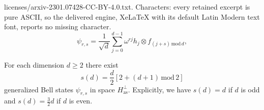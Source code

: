 \documentclass[10pt,a4paper]{amsart}
\newcommand{\aspace}{H_{\mathrm{as}}}
\begin{document}
licenses/arxiv-2301.07428-CC-BY-4.0.txt. Characters: every retained excerpt is pure ASCII, so the delivered engine, XeLaTeX with its default Latin Modern text font, reports no missing character.
\begin{equation}\label{eq:BellState}
    \psi_{r,s} = \frac{1}{\sqrt{d}} \sum_{j=0}^{d-1}\omega^{rj} h_j \otimes f_{(j+s)\,\mathrm{mod}\,d},
\end{equation}

\begin{lemma}\label{lemma:ExistenceOfBellStates}
For each dimension $d \geqslant 2$ there exist 
\begin{equation}\label{eq:sOfDBellStates}
    s(d) = \frac{d}{2} \left[2 + (d+1) \, \mathrm{mod} \, 2\right]
\end{equation}
generalized Bell states $\psi_{r,s}$ in space $\aspace^{\perp}$. Explicitly, we have $s(d) = d$ if $d$ is odd and $s(d) = \frac{3}{2}d$ if $d$ is even.
\end{lemma}
\end{document}
